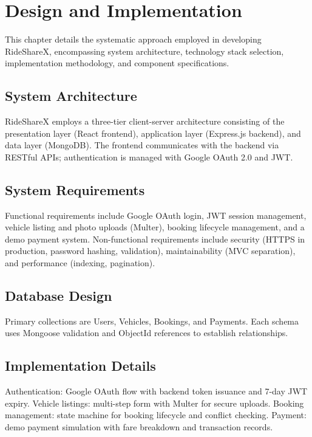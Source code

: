\chapter{Design and Implementation}

This chapter details the systematic approach employed in developing RideShareX, encompassing system architecture, technology stack selection, implementation methodology, and component specifications.

\section{System Architecture}
RideShareX employs a three-tier client-server architecture consisting of the presentation layer (React frontend), application layer (Express.js backend), and data layer (MongoDB). The frontend communicates with the backend via RESTful APIs; authentication is managed with Google OAuth 2.0 and JWT.

\section{System Requirements}
Functional requirements include Google OAuth login, JWT session management, vehicle listing and photo uploads (Multer), booking lifecycle management, and a demo payment system. Non-functional requirements include security (HTTPS in production, password hashing, validation), maintainability (MVC separation), and performance (indexing, pagination).

\section{Database Design}
Primary collections are Users, Vehicles, Bookings, and Payments. Each schema uses Mongoose validation and ObjectId references to establish relationships.

\section{Implementation Details}
Authentication: Google OAuth flow with backend token issuance and 7-day JWT expiry. Vehicle listings: multi-step form with Multer for secure uploads. Booking management: state machine for booking lifecycle and conflict checking. Payment: demo payment simulation with fare breakdown and transaction records.

